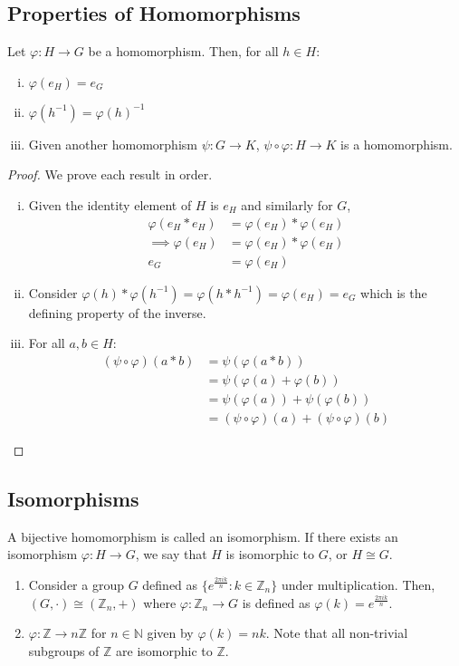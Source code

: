 \documentclass{article}
\begin{document}
	\subsection{Properties of Homomorphisms}
	\begin{proposition}
		Let $\varphi: H \to G$ be a homomorphism. Then, for all $h \in H$:
		\begin{enumerate}[i.]
			\item $\varphi(e_H) = e_G$
			\item $\varphi(h^{-1}) = \varphi(h)^{-1}$
			\item Given another homomorphism $\psi: G \to K$, $\psi \circ \varphi: H \to K$ is a homomorphism.
		\end{enumerate}
	\end{proposition}
	\begin{proof}
		We prove each result in order.
		\begin{enumerate}[i.]
			\item Given the identity element of $H$ is $e_H$ and similarly for $G$,
			\begin{align*}
				\varphi(e_H \ast e_H) &= \varphi(e_H) \ast \varphi(e_H) \\
				\implies \varphi(e_H) &= \varphi(e_H) \ast \varphi(e_H) \\
				e_G &= \varphi(e_H)
			\end{align*}
			\item Consider $\varphi(h) \ast \varphi(h^{-1}) = \varphi(h \ast h^{-1}) = \varphi(e_H) = e_G$ which is the defining property of the inverse.
			\item For all $a, b \in H$:
			\begin{align*}
				(\psi \circ \varphi) (a \ast b) &= \psi(\varphi(a \ast b)) \\
				&= \psi(\varphi(a) + \varphi(b)) \\
				&= \psi(\varphi(a)) + \psi(\varphi(b)) \\
				&= (\psi \circ \varphi)(a) + (\psi \circ \varphi)(b)
			\end{align*}
		\end{enumerate}
	\end{proof}

	\subsection{Isomorphisms}
	A bijective homomorphism is called an isomorphism. If there exists an isomorphism $\varphi: H \to G$, we say that $H$ is isomorphic to $G$, or $H \cong G$.
	\begin{enumerate}
		\item Consider a group $G$ defined as $\{ e^{\frac{2 \pi i k}{n}} : k \in \mathbb Z_n \}$ under multiplication. Then, $(G, \cdot) \cong (\mathbb Z_n, +)$ where $\varphi: \mathbb Z_n \to G$ is defined as $\varphi(k) = e^{\frac{2\pi i k}{n}}$.
		\item $\varphi: \mathbb Z \to n\mathbb Z$ for $n \in \mathbb N$ given by $\varphi(k) = nk$. Note that all non-trivial subgroups of $\mathbb Z$ are isomorphic to $\mathbb Z$.
	\end{enumerate}
\end{document}
